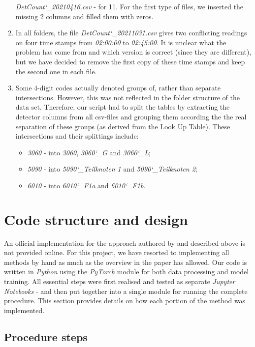 \begin{enumerate}
	\textit{DetCount\char`_20210416.csv} - for 11. For the first type of files,
	we inserted the missing 2 columns and filled them with zeros.
	\item In all folders, the file \textit{DetCount\char`_20211031.csv} gives
	two conflicting readings on four time stamps from \textit{02:00:00} to
	\textit{02:45:00}. It is unclear what the problem has come from and which
	version is correct (since they are different), but we have decided to remove
	the first copy of these time stamps and keep the second one in each file.
	\item Some 4-digit codes actually denoted groups of, rather than separate
	intersections. However, this was not reflected in the folder structure of
	the data set. Therefore, our script had to split the tables by extracting
	the detector columns from all csv-files and grouping them according the the
	real separation of these groups (as derived from the Look Up Table). These
	intersections and their splittings include:
	\begin{itemize}
		\item \textit{3060} - into \textit{3060}, \textit{3060\char`_G} and 
		\textit{3060\char`_L};
		\item \textit{5090} - into \textit{5090\char`_Teilknoten 1} and
		\textit{5090\char`_Teilknoten 2};
		\item \textit{6010} - into \textit{6010\char`_F1a} and
		\textit{6010\char`_F1b}.
	\end{itemize}
\end{enumerate}


\section{Code structure and design} \label{sec:impl-details}

An official implementation for the approach authored by \citet{Han.2020} and
described above is not provided online. For this project, we have resorted to
implementing all methods by hand as much as the overview in the paper has
allowed. Our code is written in \textit{Python} using the \textit{PyTorch}
module for both data processing and model training. All essential steps were
first realised and tested as separate \textit{Jupyter Notebooks} - and then put
together into a single module for running the complete procedure. This section 
provides details on how each portion of the method was implemented.


\subsection{Procedure steps}

